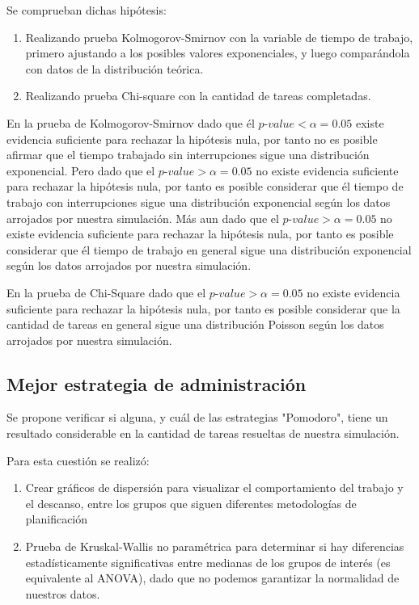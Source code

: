 \documentclass[10pt,a4paper,twocolumn]{article}
\begin{document}
Se comprueban dichas hipótesis:
\begin{enumerate}
    \item  Realizando prueba Kolmogorov-Smirnov con la variable de tiempo de trabajo, primero ajustando a los posibles valores exponenciales, y luego compar\'andola con datos de la distribución teórica.
    \item  Realizando prueba Chi-square con la cantidad de tareas completadas.
\end{enumerate}

En la prueba de Kolmogorov-Smirnov dado que \'el $p$-$value < \alpha = 0.05$ existe evidencia suficiente para rechazar la hipótesis nula, por tanto no es posible afirmar que el tiempo trabajado sin interrupciones sigue una distribución exponencial. Pero dado que el $p$-$value > \alpha = 0.05$ no existe evidencia suficiente para rechazar la hipótesis nula, por tanto es posible considerar que \'el tiempo de trabajo con interrupciones sigue una distribución exponencial seg\'un los datos arrojados por nuestra simulación. Más aun dado que el $p$-$value > \alpha = 0.05$ no existe evidencia suficiente para rechazar la hipótesis nula, por tanto es posible considerar que \'el tiempo de trabajo en general sigue una distribución exponencial seg\'un los datos arrojados por nuestra simulación.

En la prueba de Chi-Square dado que el $p$-$value > \alpha = 0.05$ no existe evidencia suficiente para rechazar la hipótesis nula, por tanto es posible considerar que la cantidad de tareas en general sigue una distribución Poisson seg\'un los datos arrojados por nuestra simulación.

\subsection{Mejor estrategia de administración}

Se propone verificar si alguna, y cu\'al de las estrategias "Pomodoro", tiene un resultado considerable en la cantidad de tareas resueltas de nuestra simulación. 

Para esta cuestión se realiz\'o:
\begin{enumerate}
    \item Crear gráficos de dispersión para visualizar el comportamiento del trabajo y el descanso, entre los grupos que siguen diferentes metodologías de planificación
    \item Prueba de Kruskal-Wallis no paramétrica para determinar si hay diferencias estadísticamente significativas entre medianas de los grupos de interés (es equivalente al ANOVA), dado que no podemos garantizar la normalidad de nuestros datos.
\end{enumerate}
\end{document}
